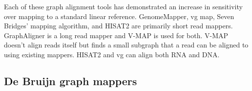 Each of these graph alignment tools has demonstrated an increase in sensitivity over mapping to a standard linear reference.
GenomeMapper, vg map, Seven Bridges' mapping algorithm, and HISAT2 are primarily short read mappers.
GraphAligner is a long read mapper and V-MAP is used for both.
V-MAP doesn't align reads itself but finds a small subgraph that a read can be aligned to using existing mappers. 
HISAT2 and vg can align both RNA and DNA.


\subsection{De Bruijn graph mappers}





